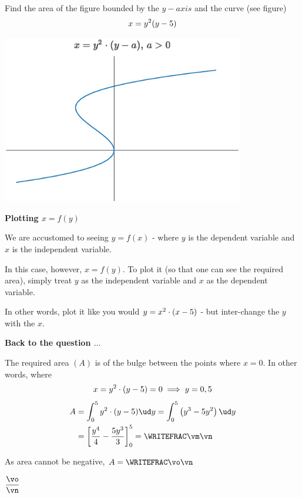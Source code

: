 

\POWER{}\vb
\FRACTIONSIMPLIFY{}\vm\vn
\ABSVALUE\vm\vo

\question[3] Find the area of the figure bounded by the $y-axis$ and the curve (see figure)
\[ x=y^2(y-5) \]

\watchout

\includegraphics[width=300pt]{plotly.eps}

\begin{solution}[\halfpage]
  \textbf{Plotting $x=f(y)$}

  We are accustomed to seeing $y=f(x)$ - where $y$ is the dependent variable and 
  $x$ is the independent variable. 
  
  In this case, however, $x=f(y)$. To plot it (so that one can see the required area), 
  simply treat $y$ as the independent variable and $x$ as the dependent variable. 

  In other words, plot it like you would $y=x^2\cdot (x-5)$ - but inter-change 
  the $y$ with the $x$. 

  \textbf{Back to the question $\ldots$}

  The required area $(A)$ is of the bulge between the points where $x=0$. In other words, where 
  \[ x = y^2\cdot(y-5) = 0\implies y = 0, 5 \]
  \begin{align}
     A &= \int_0^{\va} y^2\cdot(y-\va)\ud y 
     = \int_0^{\va}\left(y^3-\va y^2\right)\ud y \\
       &= \left[ \dfrac{y^4}{4} - \dfrac{\va y^3}{3}\right]_0^{\va} = \WRITEFRAC\vm\vn
  \end{align}
  
  As area cannot be negative, $A=\WRITEFRAC\vo\vn$
\end{solution}

\ifprintanswers
  \begin{codex}
    $\dfrac\vo\vn$
  \end{codex}
\fi

